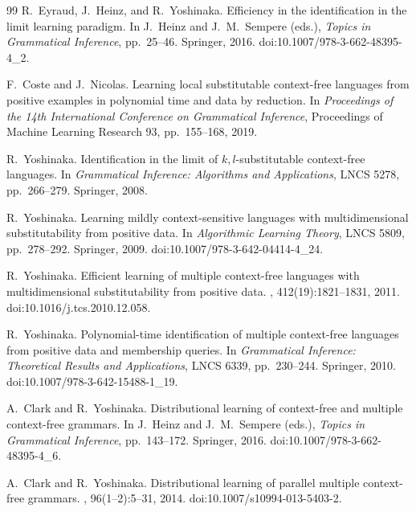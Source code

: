 \documentclass[11pt]{article}
\numberwithin{equation}{section}
\theoremstyle{plain}
\theoremstyle{definition}
\theoremstyle{remark}
\begin{document}
\begin{thebibliography}{99}
R.~Eyraud, J.~Heinz, and R.~Yoshinaka.
\newblock Efficiency in the identification in the limit learning paradigm.
\newblock In J.~Heinz and J.~M.~Sempere (eds.), {\em Topics in Grammatical
Inference}, pp.~25--46. Springer, 2016.
\newblock doi:10.1007/978-3-662-48395-4\_2.

F.~Coste and J.~Nicolas.
\newblock Learning local substitutable context-free languages from positive
examples in polynomial time and data by reduction.
\newblock In {\em Proceedings of the 14th International Conference on
Grammatical Inference}, Proceedings of Machine Learning Research 93,
pp.~155--168, 2019.

R.~Yoshinaka.
\newblock Identification in the limit of $k,l$-substitutable context-free
languages.
\newblock In {\em Grammatical Inference: Algorithms and Applications},
LNCS 5278, pp.~266--279. Springer, 2008.

R.~Yoshinaka.
\newblock Learning mildly context-sensitive languages with multidimensional
 substitutability from positive data.
\newblock In {\em Algorithmic Learning Theory}, LNCS 5809, pp.~278--292.
 Springer, 2009.
\newblock doi:10.1007/978-3-642-04414-4\_24.

R.~Yoshinaka.
\newblock Efficient learning of multiple context-free languages with
multidimensional substitutability from positive data.
, 412(19):1821--1831, 2011.
\newblock doi:10.1016/j.tcs.2010.12.058.

R.~Yoshinaka.
\newblock Polynomial-time identification of multiple context-free languages
from positive data and membership queries.
\newblock In {\em Grammatical Inference: Theoretical Results and Applications},
LNCS 6339, pp.~230--244. Springer, 2010.
\newblock doi:10.1007/978-3-642-15488-1\_19.

A.~Clark and R.~Yoshinaka.
\newblock Distributional learning of context-free and multiple context-free grammars.
\newblock In J.~Heinz and J.~M.~Sempere (eds.), \emph{Topics in Grammatical
Inference}, pp.~143--172. Springer, 2016.
\newblock doi:10.1007/978-3-662-48395-4\_6.

A.~Clark and R.~Yoshinaka.
\newblock Distributional learning of parallel multiple context-free grammars.
, 96(1--2):5--31, 2014.
\newblock doi:10.1007/s10994-013-5403-2.


\end{thebibliography}
\end{document}
